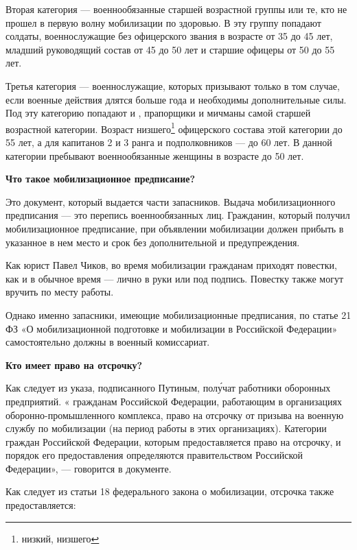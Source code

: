 Вторая категория — военнообязанные старшей возрастной группы или те, кто не прошел в первую волну мобилизации по здоровью. В эту группу попадают солдаты, военнослужащие без офицерского звания в возрасте от 35 до 45 лет, младший руководящий состав от 45 до 50 лет и старшие офицеры от 50 до 55 лет.

Третья категория — военнослужащие, которых призывают только в том случае, если военные действия длятся больше года и необходимы дополнительные силы. Под эту категорию попадают  и , прапорщики и мичманы самой старшей возрастной категории. Возраст низшего\footnote{низкий, низшего} офицерского состава этой категории до 55 лет, а для капитанов 2 и 3 ранга и подполковников — до 60 лет. В данной категории пребывают военнообязанные женщины в возрасте до 50 лет.

\textbf{Что такое мобилизационное предписание? }

Это документ, который выдается части запасников. Выдача мобилизационного предписания — это  перепись военнообязанных лиц. Гражданин, который получил мобилизационное предписание, при объявлении мобилизации должен прибыть в указанное в нем место и срок без дополнительной  и предупреждения.

Как  юрист Павел Чиков, во время мобилизации гражданам приходят повестки, как и в обычное время — лично в руки или под подпись. Повестку также могут вручить по месту работы.

Однако именно запасники, имеющие мобилизационные предписания, по статье 21 ФЗ «О мобилизационной подготовке и мобилизации в Российской Федерации» самостоятельно должны  в военный комиссариат.

\textbf{Кто имеет право на отсрочку?}

Как следует из указа, подписанного Путиным,  пол\'{у}чат работники оборонных предприятий. « гражданам Российской Федерации, работающим в организациях оборонно-промышленного комплекса, право на отсрочку от призыва на военную службу по мобилизации (на период работы в этих организациях). Категории граждан Российской Федерации, которым предоставляется право на отсрочку, и порядок его предоставления определяются правительством Российской Федерации», — говорится в документе.

Как следует из статьи 18 федерального закона о мобилизации, отсрочка также предоставляется:

